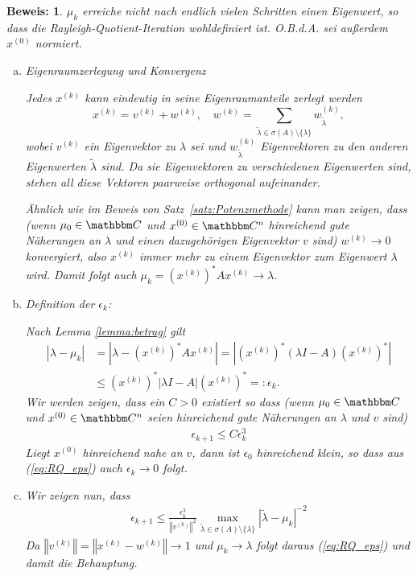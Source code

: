 \documentclass[12pt,a4paper]{book}
\theoremstyle{break}
\theoremstyle{nonumberplain}
\newtheorem{beweis}{Beweis:}
\newcommand{\C}{\mathbbm C}
\newcommand{\norm}[1]{\left\Vert#1\right\Vert}		%
\newcommand{\1}{\mathbbm{1}} 			      	%
\newcommand{\labeq}[1]{\label{eq:#1}}			%
\newcommand{\req}[1]{(\ref{eq:#1})}
\begin{document}
\begin{beweis}
$\mu_k$ erreiche nicht nach endlich vielen Schritten einen Eigenwert, so dass die Rayleigh-Quotient-Iteration wohldefiniert ist.
O.B.d.A. sei außerdem $x^{(0)}$ normiert.

\begin{enumerate}[(a)]

\item Eigenraumzerlegung und Konvergenz

Jedes $x^{(k)}$ kann eindeutig in seine Eigenraumanteile zerlegt werden
\[
x^{(k)}= v^{(k)} + w^{(k)}, \quad w^{(k)}=\sum\limits_{\tilde \lambda\in \sigma(A)\setminus \{\lambda\} } w^{(k)}_{\tilde \lambda},
\]
wobei $v^{(k)}$ ein Eigenvektor zu $\lambda$ sei und $w^{(k)}_{\tilde \lambda}$ Eigenvektoren zu den anderen Eigenwerten $\tilde \lambda$ sind.
Da sie Eigenvektoren zu verschiedenen Eigenwerten sind, stehen all diese Vektoren paarweise orthogonal aufeinander.

Ähnlich wie im Beweis von Satz~\ref{satz:Potenzmethode} kann man zeigen, dass  
(wenn $\mu_0\in \C$ und $x^{(0)}\in \C^n$ hinreichend gute Näherungen an $\lambda$ und einen dazugehörigen Eigenvektor $v$ sind) $w^{(k)}\to 0$ konvergiert, also $x^{(k)}$ immer mehr zu einem Eigenvektor zum Eigenwert $\lambda$ wird.
Damit folgt auch $\mu_k=(x^{(k)})^* A x^{(k)}\to \lambda$.

\item Definition der $\epsilon_k$:

Nach Lemma \ref{lemma:betrag} gilt 
\begin{align*}
|\lambda - \mu_{k} | &= | \lambda - (x^{(k)})^* A x^{(k)} | = | (x^{(k)})^* (\lambda I - A ) (x^{(k)})^*|\\
&\leq  (x^{(k)})^* |\lambda I - A | (x^{(k)})^*=:\epsilon_k.
\end{align*}
Wir werden zeigen, dass ein $C>0$ existiert so dass (wenn $\mu_0\in \C$ und $x^{(0)}\in \C^n$ seien hinreichend gute Näherungen an $\lambda$ und $v$ sind)
\begin{align}\labeq{RQ_eps}
\epsilon_{k+1}\leq C \epsilon_{k}^3
\end{align}
Liegt $x^{(0)}$ hinreichend nahe an $v$, dann ist $\epsilon_0$ hinreichend klein, so dass aus \req{RQ_eps} auch $\epsilon_k\to 0$ folgt.

\item Wir zeigen nun, dass
\begin{align}\labeq{RQ_hilf}
\epsilon_{k+1} \leq  \frac{\epsilon_k^3}{\norm{v^{(k)}}^2} \max\limits_{ \tilde \lambda\in \sigma(A)\setminus \{\lambda\} } |\tilde\lambda-\mu_k|^{-2}
\end{align}
Da $\norm{v^{(k)}}=\norm{x^{(k)}-w^{(k)}} \to 1$ und $\mu_k\to \lambda$ folgt daraus \req{RQ_eps} und damit die Behauptung.


\end{enumerate}
\end{beweis}
\end{document}
